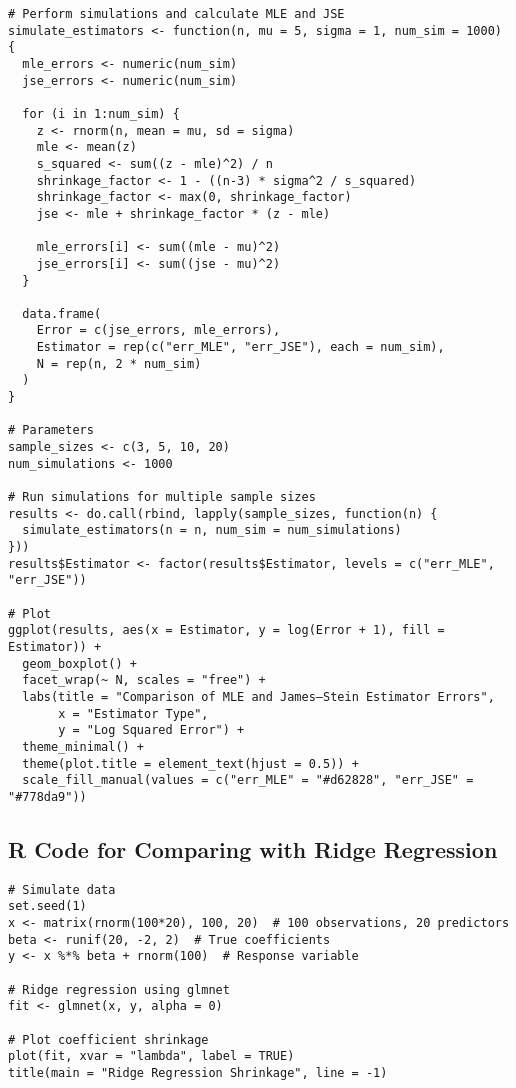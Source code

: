 \begin{verbatim}
# Perform simulations and calculate MLE and JSE
simulate_estimators <- function(n, mu = 5, sigma = 1, num_sim = 1000) {
  mle_errors <- numeric(num_sim)
  jse_errors <- numeric(num_sim)
  
  for (i in 1:num_sim) {
    z <- rnorm(n, mean = mu, sd = sigma)
    mle <- mean(z)
    s_squared <- sum((z - mle)^2) / n
    shrinkage_factor <- 1 - ((n-3) * sigma^2 / s_squared)
    shrinkage_factor <- max(0, shrinkage_factor)
    jse <- mle + shrinkage_factor * (z - mle)
    
    mle_errors[i] <- sum((mle - mu)^2)
    jse_errors[i] <- sum((jse - mu)^2)
  }
  
  data.frame(
    Error = c(jse_errors, mle_errors),
    Estimator = rep(c("err_MLE", "err_JSE"), each = num_sim),
    N = rep(n, 2 * num_sim)
  )
}

# Parameters
sample_sizes <- c(3, 5, 10, 20)
num_simulations <- 1000

# Run simulations for multiple sample sizes
results <- do.call(rbind, lapply(sample_sizes, function(n) {
  simulate_estimators(n = n, num_sim = num_simulations)
}))
results$Estimator <- factor(results$Estimator, levels = c("err_MLE", "err_JSE"))

# Plot
ggplot(results, aes(x = Estimator, y = log(Error + 1), fill = Estimator)) +
  geom_boxplot() +
  facet_wrap(~ N, scales = "free") +
  labs(title = "Comparison of MLE and James–Stein Estimator Errors",
       x = "Estimator Type",
       y = "Log Squared Error") +
  theme_minimal() +
  theme(plot.title = element_text(hjust = 0.5)) +
  scale_fill_manual(values = c("err_MLE" = "#d62828", "err_JSE" = "#778da9"))
\end{verbatim}

\subsection{R Code for Comparing with Ridge Regression}

\begin{verbatim}
# Simulate data
set.seed(1)
x <- matrix(rnorm(100*20), 100, 20)  # 100 observations, 20 predictors
beta <- runif(20, -2, 2)  # True coefficients
y <- x %*% beta + rnorm(100)  # Response variable

# Ridge regression using glmnet
fit <- glmnet(x, y, alpha = 0)

# Plot coefficient shrinkage
plot(fit, xvar = "lambda", label = TRUE)
title(main = "Ridge Regression Shrinkage", line = -1)
\end{verbatim}